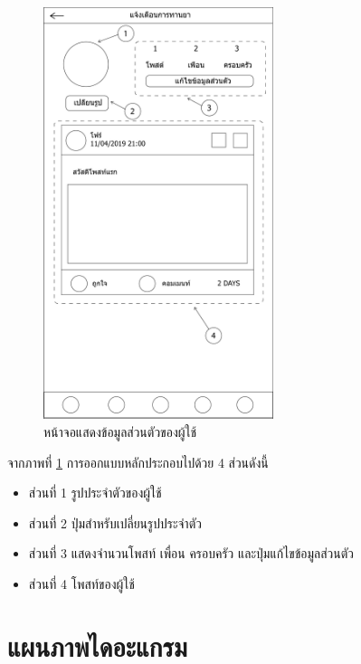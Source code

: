 		\begin{figure}[H]
			\centering
			\includegraphics[width=0.6\textwidth]{Figures/3/UI/profile}
			\caption{หน้าจอแสดงข้อมูลส่วนตัวของผู้ใช้}
			\label{Fig:โปรไฟล์}
		\end{figure}
		จากภาพที่ \ref{Fig:โปรไฟล์} การออกแบบหลักประกอบไปด้วย 4 ส่วนดังนี้
		\begin{itemize}
			\item ส่วนที่ 1 รูปประจำตัวของผู้ใช้
			\item ส่วนที่ 2 ปุ่มสำหรับเปลี่ยนรูปประจำตัว
			\item ส่วนที่ 3 แสดงจำนวนโพสท์ เพื่อน ครอบครัว และปุ่มแก้ไขข้อมูลส่วนตัว
			\item ส่วนที่ 4 โพสท์ของผู้ใช้
		\end{itemize}
\newpage



\section{แผนภาพไดอะแกรม}


